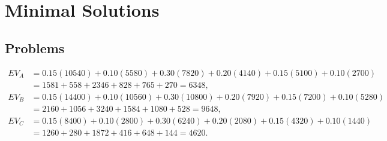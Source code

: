 \section{Minimal Solutions}

\subsection*{Problems}
\[\begin{aligned}
		EV_A &= 0.15(10540)+0.10(5580)+0.30(7820)+0.20(4140)+0.15(5100)+0.10(2700)\\
		&= 1581+558+2346+828+765+270=6348,\\
		EV_B &= 0.15(14400)+0.10(10560)+0.30(10800)+0.20(7920)+0.15(7200)+0.10(5280)\\
		&= 2160+1056+3240+1584+1080+528=9648,\\
		EV_C &= 0.15(8400)+0.10(2800)+0.30(6240)+0.20(2080)+0.15(4320)+0.10(1440)\\
		&= 1260+280+1872+416+648+144=4620.
		\end{aligned}\]


